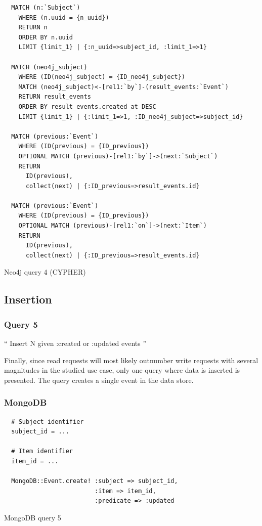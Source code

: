 \begin{listing}[H]
  \begin{verbatim}
  MATCH (n:`Subject`)
    WHERE (n.uuid = {n_uuid})
    RETURN n
    ORDER BY n.uuid
    LIMIT {limit_1} | {:n_uuid=>subject_id, :limit_1=>1}

  MATCH (neo4j_subject)
    WHERE (ID(neo4j_subject) = {ID_neo4j_subject})
    MATCH (neo4j_subject)<-[rel1:`by`]-(result_events:`Event`)
    RETURN result_events
    ORDER BY result_events.created_at DESC
    LIMIT {limit_1} | {:limit_1=>1, :ID_neo4j_subject=>subject_id}

  MATCH (previous:`Event`)
    WHERE (ID(previous) = {ID_previous})
    OPTIONAL MATCH (previous)-[rel1:`by`]->(next:`Subject`)
    RETURN
      ID(previous),
      collect(next) | {:ID_previous=>result_events.id}

  MATCH (previous:`Event`)
    WHERE (ID(previous) = {ID_previous})
    OPTIONAL MATCH (previous)-[rel1:`on`]->(next:`Item`)
    RETURN
      ID(previous),
      collect(next) | {:ID_previous=>result_events.id}
  \end{verbatim}

  \caption{Neo4j query 4 (CYPHER)}
  \label{lst:neo4j-query-4}
\end{listing}

\subsection{Insertion}
\label{subsec:insertion}

\subsubsection{Query 5}
\label{subsubsec:query-5}

``
Insert N given :created or :updated events
''

Finally, since read requests will most likely outnumber write requests with several magnitudes in the studied use case, only one query where data is inserted is presented.
The query creates a single event in the data store.

\subsubsection*{MongoDB}

\begin{listing}[H]
  \begin{verbatim}
  # Subject identifier
  subject_id = ...

  # Item identifier
  item_id = ...

  MongoDB::Event.create! :subject => subject_id,
                         :item => item_id,
                         :predicate => :updated
  \end{verbatim}

  \caption{MongoDB query 5}
  \label{lst:mongodb-query-5}
\end{listing}

